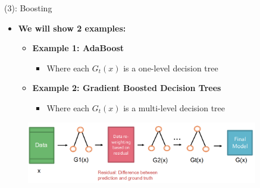 \begin{frame}[allowframebreaks]{(3): Boosting}
\begin{itemize}
    \item \textbf{We will show 2 examples:}
    \begin{itemize}
        \item \textbf{Example 1: AdaBoost}
        \begin{itemize}
            \item Where each $G_t(x)$ is a one-level decision tree
        \end{itemize}
        \item \textbf{Example 2: Gradient Boosted Decision Trees}
        \begin{itemize}
            \item Where each $G_t(x)$ is a multi-level decision tree
        \end{itemize}
    \end{itemize}
\end{itemize}

\begin{figure}[h]
    \centering
    \includegraphics[width=0.9\textwidth]{images/decision-trees/decision-trees-15.png}
\end{figure}

\end{frame}
